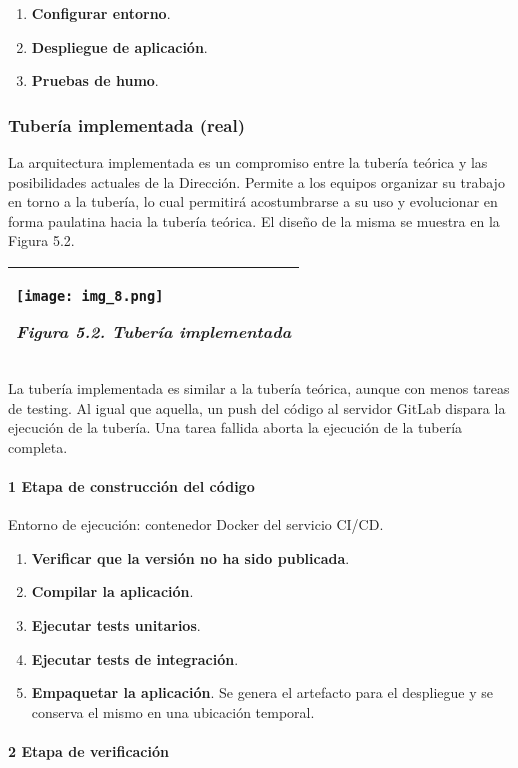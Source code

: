 \begin{enumerate}
\item \textbf{Configurar entorno}.
\item \textbf{Despliegue de aplicación}.
\item \textbf{Pruebas de humo}.
\end{enumerate}
\subsubsection{Tubería implementada (real) }

La arquitectura implementada es un compromiso entre la tubería teórica y las posibilidades actuales de la Dirección. Permite a los equipos organizar su trabajo en torno a la tubería, lo cual permitirá acostumbrarse a su uso y evolucionar en forma paulatina hacia la tubería teórica. El diseño de la misma se muestra en la Figura 5.2.

\begin{tabular}{|l|}
\hline
\texttt{[image: img\_8.png]}


\textit{Figura 5.2. Tubería implementada} \\ \hline
\end{tabular}
La tubería implementada es similar a la tubería teórica, aunque con menos tareas de testing. Al igual que aquella, un push del código al servidor GitLab dispara la ejecución de la tubería. Una tarea fallida aborta la ejecución de la tubería completa.

\paragraph{1 Etapa de construcción del código}

Entorno de ejecución: contenedor Docker del servicio CI/CD.

\begin{enumerate}
\item \textbf{Verificar que la versión no ha sido publicada}.
\item \textbf{Compilar la aplicación}.
\item \textbf{Ejecutar tests unitarios}.
\item \textbf{Ejecutar tests de integración}.
\item \textbf{Empaquetar la aplicación}. Se genera el artefacto para el despliegue y se conserva el mismo en una ubicación temporal.
\end{enumerate}
\paragraph{2 Etapa de verificación}

